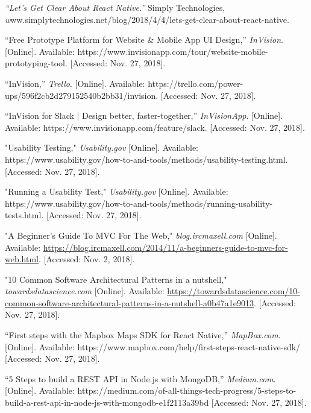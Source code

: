 \documentclass[draftclsnofoot, onecolumn, letterpaper,10pt,compsoc]{IEEEtran}
\begin{document}
\newpage
\begin{thebibliography}{10}
\textit{“Let's Get Clear About React Native.”} Simply Technologies, \textit www.simplytechnologies.net/blog/2018/4/4/lets-get-clear-about-react-native.

“Free Prototype Platform for Website \& Mobile App UI Design,” 
\textit{InVision}. 
[Online]. Available: https://www.invisionapp.com/tour/website-mobile-prototyping-tool. [Accessed: Nov. 27, 2018].

“InVision,” 
\textit{Trello}. 
[Online]. Available: https://trello.com/power-ups/596f2cb2d279152540b2bb31/invision. [Accessed: Nov. 27, 2018].

“InVision for Slack | Design better, faster-together,” 
\textit{InVisionApp}. 
[Online]. Available: https://www.invisionapp.com/feature/slack. [Accessed: Nov. 27, 2018].

"Usability Testing,"
\textit{Usability.gov}
[Online]. Available: https://www.usability.gov/how-to-and-tools/methods/usability-testing.html. [Accessed: Nov. 27, 2018].

"Running a Usability Test,"
\textit{Usability.gov}
[Online]. Available: https://www.usability.gov/how-to-and-tools/methods/running-usability-tests.html. [Accessed: Nov. 27, 2018].

"A Beginner's Guide To MVC For The Web,"
\textit{blog.ircmaxell.com}
[Online]. Available: \url{https://blog.ircmaxell.com/2014/11/a-beginners-guide-to-mvc-for-web.html}.
[Accessed: Nov.  2, 2018].

"10 Common Software Architectural Patterns in a nutshell,"
\textit{towardsdatascience.com}
[Online]. Available: \url{https://towardsdatascience.com/10-common-software-architectural-patterns-in-a-nutshell-a0b47a1e9013}.
[Accessed: Nov.  27, 2018].

“First steps with the Mapbox Maps SDK for React Native,” 
\textit{MapBox.com}. 
[Online]. Available: https://www.mapbox.com/help/first-steps-react-native-sdk/ [Accessed: Nov. 27, 2018].

“5 Steps to build a REST API in Node.js with MongoDB,” 
\textit{Medium.com}. 
[Online]. Available: https://medium.com/of-all-things-tech-progress/5-steps-to-build-a-rest-api-in-node-js-with-mongodb-e1f2113a39bd [Accessed: Nov. 27, 2018].

\end{thebibliography}
\end{document}
